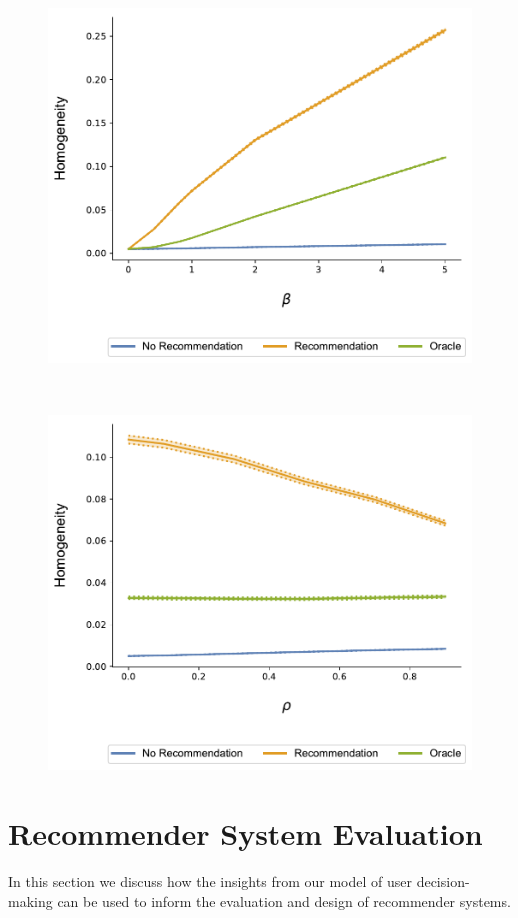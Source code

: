 \documentclass[sigconf]{acmart}
\begin{document}
\begin{figure}[t]
\includegraphics[width=.8\linewidth]{figures/beta_homogeneity_N_200_T_20}
\label{fig:beta_homo}
\end{figure}
~

\begin{figure}[t]
\includegraphics[width=.8\linewidth]{figures/rho_homogeneity_N_200_T_20}
\label{fig:cor_homo}
\end{figure}

\section{Recommender System Evaluation}
In this section we discuss how the insights from our model of user decision-making can be used to inform the evaluation and design of recommender systems.
\par
\end{document}

